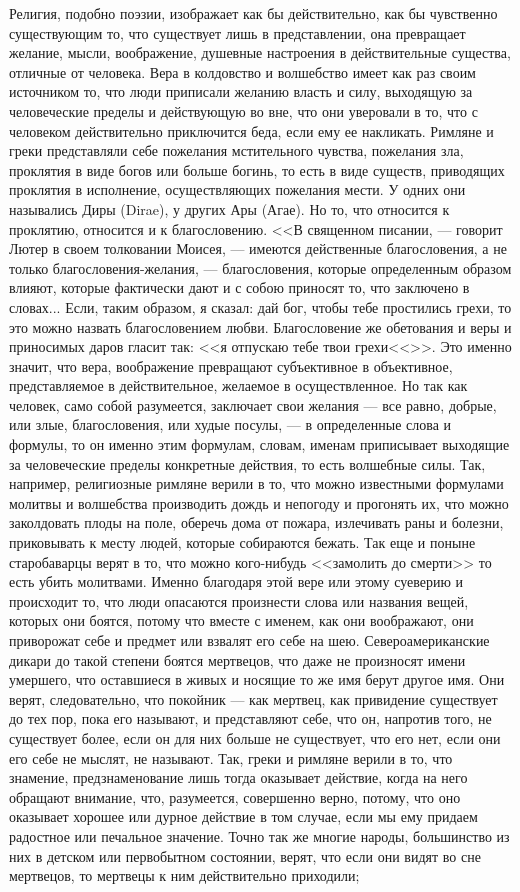 \documentclass[12pt]{article}
\begin{document}
Религия, подобно поэзии, изображает как бы действительно, как бы чувственно существующим то, что существует лишь в представлении, она превращает желание, мысли, воображение, душевные настроения в действительные существа, отличные от человека. Вера в колдовство и волшебство имеет как раз своим источником то, что люди приписали желанию власть и силу, выходящую за человеческие пределы и действующую во вне, что они уверовали в то, что с человеком действительно приключится беда, если ему ее накликать. Римляне и греки представляли себе пожелания мстительного чувства, пожелания зла, проклятия в виде богов или больше богинь, то есть в виде существ, приводящих проклятия в исполнение, осуществляющих пожелания мести. У одних они назывались Диры (Dirae), у других Ары (Агае). Но то, что относится к проклятию, относится и к благословению. <<В священном писании, --- говорит Лютер в своем толковании Моисея, --- имеются действенные благословения, а не только благословения-желания, --- благословения, которые определенным образом влияют, которые фактически дают и с собою приносят то, что заключено в словах... Если, таким образом, я сказал: дай бог, чтобы тебе простились грехи, то это можно назвать благословением любви. Благословение же обетования и веры и приносимых даров гласит так: <<я отпускаю тебе твои грехи<<>>. Это именно значит, что вера, воображение превращают субъективное в объективное, представляемое в действительное, желаемое в осуществленное. Но так как человек, само собой разумеется, заключает свои желания --- все равно, добрые, или злые, благословения, или худые посулы, --- в определенные слова и формулы, то он именно этим формулам, словам, именам приписывает выходящие за человеческие пределы конкретные действия, то есть волшебные силы. Так, например, религиозные римляне верили в то, что можно известными формулами молитвы и волшебства производить дождь и непогоду и прогонять их, что можно заколдовать плоды на поле, оберечь дома от пожара, излечивать раны и болезни, приковывать к месту людей, которые собираются бежать. Так еще и поныне старобаварцы верят в то, что можно кого-нибудь <<замолить до смерти>>  то есть убить молитвами. Именно благодаря этой вере или этому суеверию и происходит то, что люди опасаются произнести слова или названия вещей, которых они боятся, потому что вместе с именем, как они воображают, они приворожат себе и предмет или взвалят его себе на шею. Североамериканские дикари до такой степени боятся мертвецов, что даже не произносят имени умершего, что оставшиеся в живых и носящие то же имя берут другое имя. Они верят, следовательно, что покойник --- как мертвец, как привидение существует до тех пор, пока его называют, и представляют себе, что он, напротив того, не существует более, если он для них больше не существует, что его нет, если они его себе не мыслят, не называют. Так, греки и римляне верили в то, что знамение, предзнаменование лишь тогда оказывает действие, когда на него обращают внимание, что, разумеется, совершенно верно, потому, что оно оказывает хорошее или дурное действие в том случае, если мы ему придаем радостное или печальное значение. Точно так же многие народы, большинство из них в детском или первобытном состоянии, верят, что если они видят во сне мертвецов, то мертвецы к ним действительно приходили; 
\end{document}

